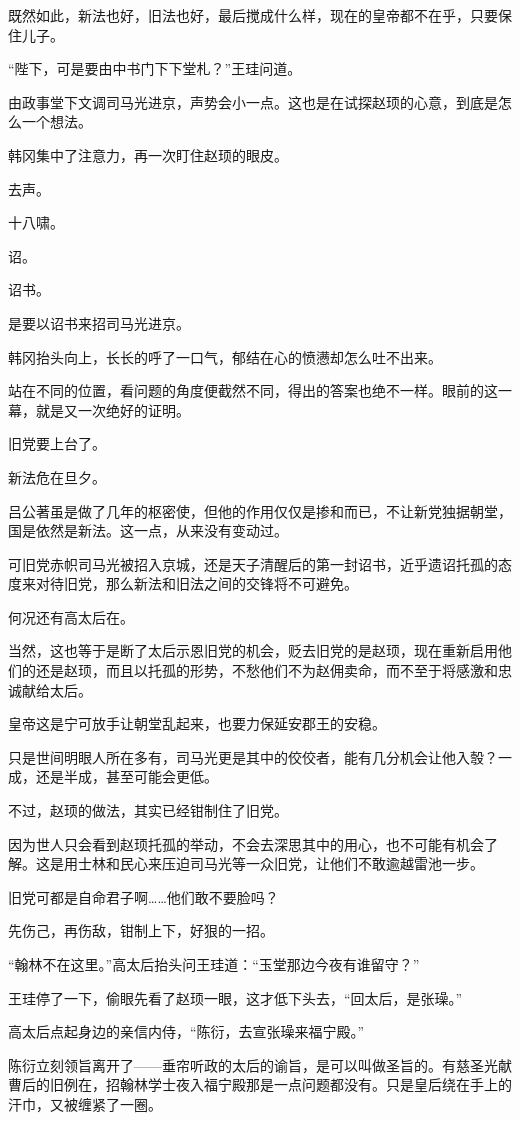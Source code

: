既然如此，新法也好，旧法也好，最后搅成什么样，现在的皇帝都不在乎，只要保住儿子。

“陛下，可是要由中书门下下堂札？”王珪问道。

由政事堂下文调司马光进京，声势会小一点。这也是在试探赵顼的心意，到底是怎么一个想法。

韩冈集中了注意力，再一次盯住赵顼的眼皮。

去声。

十八啸。

诏。

诏书。

是要以诏书来招司马光进京。

韩冈抬头向上，长长的呼了一口气，郁结在心的愤懑却怎么吐不出来。

站在不同的位置，看问题的角度便截然不同，得出的答案也绝不一样。眼前的这一幕，就是又一次绝好的证明。

旧党要上台了。

新法危在旦夕。

吕公著虽是做了几年的枢密使，但他的作用仅仅是掺和而已，不让新党独据朝堂，国是依然是新法。这一点，从来没有变动过。

可旧党赤帜司马光被招入京城，还是天子清醒后的第一封诏书，近乎遗诏托孤的态度来对待旧党，那么新法和旧法之间的交锋将不可避免。

何况还有高太后在。

当然，这也等于是断了太后示恩旧党的机会，贬去旧党的是赵顼，现在重新启用他们的还是赵顼，而且以托孤的形势，不愁他们不为赵佣卖命，而不至于将感激和忠诚献给太后。

皇帝这是宁可放手让朝堂乱起来，也要力保延安郡王的安稳。

只是世间明眼人所在多有，司马光更是其中的佼佼者，能有几分机会让他入彀？一成，还是半成，甚至可能会更低。

不过，赵顼的做法，其实已经钳制住了旧党。

因为世人只会看到赵顼托孤的举动，不会去深思其中的用心，也不可能有机会了解。这是用士林和民心来压迫司马光等一众旧党，让他们不敢逾越雷池一步。

旧党可都是自命君子啊……他们敢不要脸吗？

先伤己，再伤敌，钳制上下，好狠的一招。

“翰林不在这里。”高太后抬头问王珪道：“玉堂那边今夜有谁留守？”

王珪停了一下，偷眼先看了赵顼一眼，这才低下头去，“回太后，是张璪。”

高太后点起身边的亲信内侍，“陈衍，去宣张璪来福宁殿。”

陈衍立刻领旨离开了——垂帘听政的太后的谕旨，是可以叫做圣旨的。有慈圣光献曹后的旧例在，招翰林学士夜入福宁殿那是一点问题都没有。只是皇后绕在手上的汗巾，又被缠紧了一圈。

